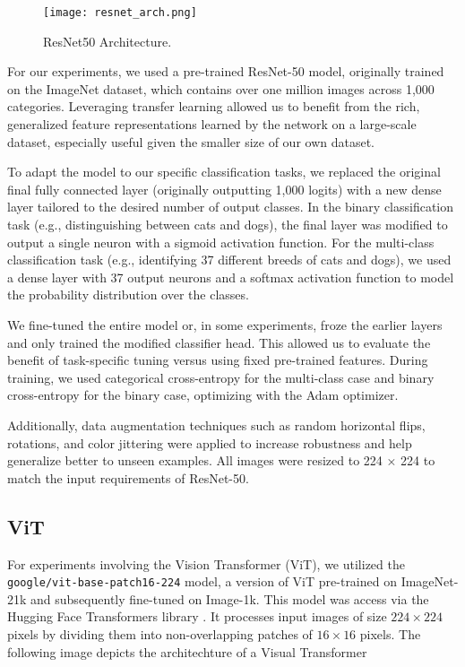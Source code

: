 \documentclass{article}
\begin{document}
\begin{figure}[h]
    \centering
    \texttt{[image: resnet\_arch.png]}
    \caption{ResNet50 Architecture.}
    \label{fig:resnet_architecture}
\end{figure}

For our experiments, we used a pre-trained ResNet-50 model, originally trained on the ImageNet dataset, which contains over one million images across 1,000 categories. Leveraging transfer learning allowed us to benefit from the rich, generalized feature representations learned by the network on a large-scale dataset, especially useful given the smaller size of our own dataset.

To adapt the model to our specific classification tasks, we replaced the original final fully connected layer (originally outputting 1,000 logits) with a new dense layer tailored to the desired number of output classes. In the binary classification task (e.g., distinguishing between cats and dogs), the final layer was modified to output a single neuron with a sigmoid activation function. For the multi-class classification task (e.g., identifying 37 different breeds of cats and dogs), we used a dense layer with 37 output neurons and a softmax activation function to model the probability distribution over the classes.

We fine-tuned the entire model or, in some experiments, froze the earlier layers and only trained the modified classifier head. This allowed us to evaluate the benefit of task-specific tuning versus using fixed pre-trained features. During training, we used categorical cross-entropy for the multi-class case and binary cross-entropy for the binary case, optimizing with the Adam optimizer.

Additionally, data augmentation techniques such as random horizontal flips, rotations, and color jittering were applied to increase robustness and help generalize better to unseen examples. All images were resized to 224 × 224 to match the input requirements of ResNet-50.

\subsection{ViT}
For experiments involving the Vision Transformer (ViT), we utilized the \texttt{google/vit-base-patch16-224} model, a version of ViT pre-trained on ImageNet-21k and subsequently fine-tuned on Image-1k. This model was access via the Hugging Face Transformers library \citep{wolf-etal-2020-transformers}. It processes input images of size $224 \times 224$ pixels by dividing them into non-overlapping patches of $16 \times 16$ pixels. The following image depicts the architechture of a Visual Transformer
\end{document}

